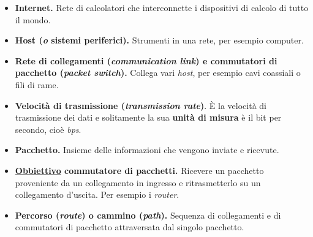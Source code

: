 \documentclass[a4paper]{article}
\begin{document}
	\begin{itemize}
		\item[\ding{42}] \textbf{Internet.} Rete di calcolatori che interconnette i dispositivi di calcolo di tutto il mondo.
		
		\item[\ding{42}] \textbf{Host (\emph{o} sistemi periferici).} Strumenti in una rete, per esempio computer.
		
		\item[\ding{42}] \textbf{Rete di collegamenti (\emph{communication link}) e commutatori di pacchetto (\emph{packet switch}).} Collega vari \emph{host}, per esempio cavi coassiali o fili di rame.
		
		\item[\ding{42}] \textbf{Velocità di trasmissione (\emph{transmission rate})}. È la velocità di trasmissione dei dati e solitamente la sua \textbf{unità di misura} è il bit per secondo, cioè \emph{bps}.
		
		\item[\ding{42}] \textbf{Pacchetto.} Insieme delle informazioni che vengono inviate e ricevute.
		
		\item[\ding{42}] \textbf{\underline{Obbiettivo} commutatore di pacchetti.} Ricevere un pacchetto proveniente da un collegamento in ingresso e ritrasmetterlo su un collegamento d'uscita. Per esempio i \emph{router}.
		
		\item[\ding{42}] \textbf{Percorso (\emph{route}) o cammino (\emph{path}).} Sequenza di collegamenti e di commutatori di pacchetto attraversata dal singolo pacchetto.
	\end{itemize}
\end{document}

